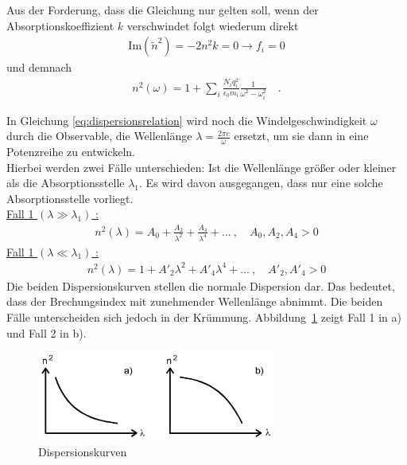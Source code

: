 Aus der Forderung, dass die Gleichung nur gelten soll, wenn der Absorptionskoeffizient $k$ verschwindet folgt wiederum direkt
\begin{align}
\text{Im}\left( \tilde{n}^2 \right) = -2 n^2 k = 0 \rightarrow f_i = 0
\end{align}
und demnach
\begin{align} \label{eq:dispersionsrelation}
n^2(\omega) = 1 + \sum_{i} \frac{N_i q_i^2}{\epsilon_0 m_i} \frac{1}{\omega^2 - \omega_i^2}  \quad.
\end{align}
\clearpage

In Gleichung \eqref{eq:dispersionsrelation} wird noch die Windelgeschwindigkeit $\omega$ durch die Observable, die Wellenlänge $\lambda  = \frac{2 \pi c}{\omega}$ ersetzt, um sie dann in eine Potenzreihe zu entwickeln. \\
Hierbei werden zwei Fälle unterschieden: Ist die Wellenlänge größer oder kleiner als die Absorptionsstelle $\lambda_1$. Es wird davon ausgegangen, dass nur eine solche Absorptionsstelle vorliegt. \\
\underline{Fall 1 $(\lambda \gg \lambda_1)$ :}  \\
\begin{align}\label{Fall1}
n^2(\lambda) = A_0 + \frac{A_2}{\lambda^2} + \frac{A_4}{\lambda^4} + ... \ , \quad A_0, A_2, A_4 > 0
\end{align}
\underline{Fall 1 $(\lambda \ll \lambda_1)$ :}  \\
\begin{align}\label{Fall2}
n^2(\lambda) = 1 + A'_2 \lambda^2 + A'_4 \lambda^4 + ... \ , \quad A'_2, A'_4 > 0
\end{align}
Die beiden Dispersionskurven stellen die normale Dispersion dar. Das bedeutet, dass der Brechungsindex mit zunehmender Wellenlänge abnimmt. Die beiden Fälle unterscheiden sich jedoch in der Krümmung. Abbildung~\ref{fig:dispersionskurven} zeigt Fall 1 in a) und Fall 2 in b).

\begin{figure}[h!]
	\centering
	\includegraphics[width=0.7\textwidth]{Theorie.png}
	\caption{Dispersionskurven}
	\label{fig:dispersionskurven}
\end{figure}